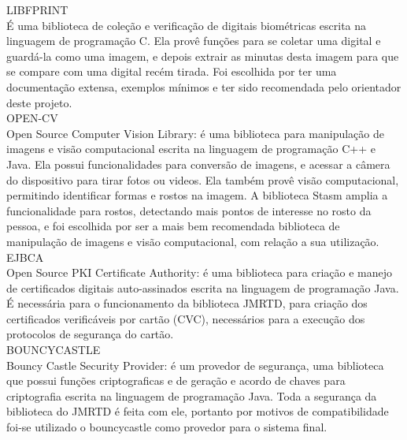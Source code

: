 \documentclass{article}
\begin{document}
\begin{justify}
        \hspace*{2cm}LIBFPRINT\\
    \hspace*{2cm}É uma biblioteca de coleção e verificação de digitais biométricas escrita na linguagem de programação C. Ela provê funções para se coletar uma digital e guardá-la como uma imagem, e depois extrair as minutas desta imagem para que se compare com uma digital recém tirada. Foi escolhida por ter uma documentação extensa, exemplos mínimos e ter sido recomendada pelo orientador deste projeto.\\
		
        \hspace*{2cm}OPEN-CV\\
    \hspace*{2cm}Open Source Computer Vision Library: é uma biblioteca para manipulação de imagens e visão computacional escrita na linguagem de programação C++ e Java. Ela possui funcionalidades para conversão de imagens, e acessar a câmera do dispositivo para tirar fotos ou videos. Ela também provê visão computacional, permitindo identificar formas e rostos na imagem. A biblioteca Stasm amplia a funcionalidade para rostos, detectando mais pontos de interesse no rosto da pessoa, e foi escolhida por ser a mais bem recomendada biblioteca de manipulação de imagens e visão computacional, com relação a sua utilização.\\
		
        \hspace*{2cm}EJBCA\\
    \hspace*{2cm}Open Source PKI Certificate Authority: é uma biblioteca para criação e manejo de certificados digitais auto-assinados escrita na linguagem de programação Java. É necessária para o funcionamento da biblioteca JMRTD, para criação dos certificados verificáveis por cartão (CVC), necessários para a execução dos protocolos de segurança do cartão.\\
		
        \hspace*{2cm}BOUNCYCASTLE\\
    \hspace*{2cm}Bouncy Castle Security Provider: é um provedor de segurança, uma biblioteca que possui funções criptograficas e de geração e acordo de chaves para criptografia escrita na linguagem de programação Java. Toda a segurança da biblioteca do JMRTD é feita com ele, portanto por motivos de compatibilidade foi-se utilizado o bouncycastle como provedor para o sistema final.\\

			
		\end{justify}
\end{document}
